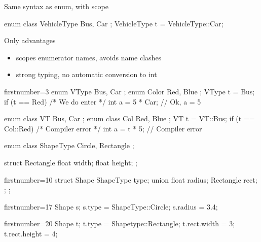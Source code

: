 \begin{frame}[fragile]
  \begin{block}{Same syntax as enum, with scope}
    \begin{cppcode*}{}
      enum class VehicleType { Bus, Car };
      VehicleType t = VehicleType::Car;
    \end{cppcode*}
  \end{block}
  \pause
  \begin{exampleblock}{Only advantages}
    \begin{itemize}
    \item scopes enumerator names, avoids name clashes
    \item strong typing, no automatic conversion to int
    \end{itemize}
    \small
    \begin{cppcode*}{firstnumber=3}
      enum VType { Bus, Car }; enum Color { Red, Blue };
      VType t = Bus;
      if (t == Red) { /* We do enter */ }
      int a = 5 * Car; // Ok, a = 5

      enum class VT { Bus, Car }; enum class Col { Red, Blue };
      VT t = VT::Bus;
      if (t == Col::Red) { /* Compiler error */ }
      int a = t * 5;       // Compiler error
    \end{cppcode*}
  \end{exampleblock}
\end{frame}

\begin{frame}[fragile]
  \begin{multicols}{2}
    \begin{cppcode*}{}
      enum class ShapeType {
        Circle,
        Rectangle
      };

      struct Rectangle {
        float width;
        float height;
      };
    \end{cppcode*}
    \columnbreak
    \pause
    \begin{cppcode*}{firstnumber=10}
      struct Shape {
        ShapeType type;
        union {
          float radius;
          Rectangle rect;
        };
      };
    \end{cppcode*}
  \end{multicols}
  \pause
  \begin{multicols}{2}
    \begin{cppcode*}{firstnumber=17}
      Shape s;
      s.type =
        ShapeType::Circle;
      s.radius = 3.4;

    \end{cppcode*}
    \columnbreak
    \begin{cppcode*}{firstnumber=20}
      Shape t;
      t.type =
        Shapetype::Rectangle;
      t.rect.width = 3;
      t.rect.height = 4;
    \end{cppcode*}
  \end{multicols}
\end{frame}

